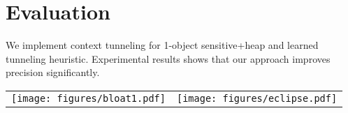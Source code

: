 \section{Evaluation}
We implement context tunneling for 1-object sensitive+heap and learned tunneling heuristic. Experimental results shows that our approach improves precision significantly.\\
		\begin{tabular}{cc}
			\texttt{[image: figures/bloat1.pdf]} &
			\texttt{[image: figures/eclipse.pdf]}\\
		\end{tabular}


\begin{comment}
\subsection{Can be Combine with Selective Context sensitivity}
We can apply both tunneling and selective contextsensitivity.\\
\texttt{[image: figures/bloat2.pdf]}
\end{comment}
